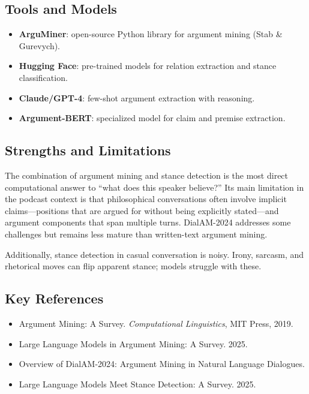 \documentclass[11pt,letterpaper]{article}
\begin{document}
\subsection{Tools and Models}

\begin{itemize}
  \item \textbf{ArguMiner}: open-source Python library for argument mining (Stab \& Gurevych).
  \item \textbf{Hugging Face}: pre-trained models for relation extraction and stance classification.
  \item \textbf{Claude/GPT-4}: few-shot argument extraction with reasoning.
  \item \textbf{Argument-BERT}: specialized model for claim and premise extraction.
\end{itemize}

\subsection{Strengths and Limitations}

The combination of argument mining and stance detection is the most direct computational answer to ``what does this speaker believe?'' Its main limitation in the podcast context is that philosophical conversations often involve implicit claims—positions that are argued for without being explicitly stated—and argument components that span multiple turns. DialAM-2024 addresses some challenges but remains less mature than written-text argument mining.

Additionally, stance detection in casual conversation is noisy. Irony, sarcasm, and rhetorical moves can flip apparent stance; models struggle with these.

\subsection{Key References}

\begin{itemize}
  \item Argument Mining: A Survey. \textit{Computational Linguistics}, MIT Press, 2019.
  \item Large Language Models in Argument Mining: A Survey. 2025.
  \item Overview of DialAM-2024: Argument Mining in Natural Language Dialogues.
  \item Large Language Models Meet Stance Detection: A Survey. 2025.
\end{itemize}
\end{document}
